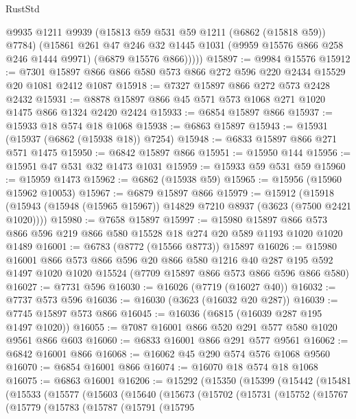 \begin{lexlean}{RustStd}
\begin{coremodule}
          @9935
          @1211
          @9939
          (@15813 @59 @531 @59 @1211 (@6862 (@15818 @59)) @7784)
          (@15861
            @261
            @47
            @246
            @32
            @1445
            @1031
            (@9959 @15576 @866 @258 @246 @1444 @9971)
            (@6879 @15576 @866)))))
@15897 := @9984 @15576
@15912 := @7301 @15897 @866 @866 @580 @573 @866 @272 @596 @220 @2434 @15529 @20 @1081 @2412 @1087
@15918 := @7327 @15897 @866 @272 @573 @2428 @2432
@15931 := @8878 @15897 @866 @45 @571 @573 @1068 @271 @1020 @1475 @866 @1324 @2420 @2424
@15933 := @6854 @15897 @866
@15937 := @15933 @18 @574 @18 @1068
@15938 := @6863 @15897
@15943 := @15931 (@15937 (@6862 (@15938 @18)) @7254)
@15948 := @6833 @15897 @866 @271 @571 @1475
@15950 := @6842 @15897 @866
@15951 := @15950 @144
@15956 := @15951 @47 @531 @32 @1473 @1031
@15959 := @15933 @59 @531 @59
@15960 := @15959 @1473
@15962 := @6862 (@15938 @59)
@15965 := @15956 (@15960 @15962 @10053)
@15967 := @6879 @15897 @866
@15979 := @15912
    (@15918 (@15943 (@15948 (@15965 @15967)) @14829 @7210 @8937 (@3623 (@7500 @2421 @1020))))
@15980 := @7658 @15897
@15997 := @15980
    @15897
    @866
    @573
    @866
    @596
    @219
    @866
    @580
    @15528
    @18
    @274
    @20
    @589
    @1193
    @1020
    @1020
    @1489
@16001 := @6783 (@8772 (@15566 @8773)) @15897
@16026 := @15980
    @16001
    @866
    @573
    @866
    @596
    @20
    @866
    @580
    @1216
    @40
    @287
    @195
    @592
    @1497
    @1020
    @1020
    @15524
    (@7709 @15897 @866 @573 @866 @596 @866 @580)
@16027 := @7731 @596
@16030 := @16026 (@7719 (@16027 @40))
@16032 := @7737 @573 @596
@16036 := @16030 (@3623 (@16032 @20 @287))
@16039 := @7745 @15897 @573 @866
@16045 := @16036 (@6815 (@16039 @287 @195 @1497 @1020))
@16055 := @7087 @16001 @866 @520 @291 @577 @580 @1020 @9561 @866 @603
@16060 := @6833 @16001 @866 @291 @577 @9561
@16062 := @6842 @16001 @866
@16068 := @16062 @45 @290 @574 @576 @1068 @9560
@16070 := @6854 @16001 @866
@16074 := @16070 @18 @574 @18 @1068
@16075 := @6863 @16001
@16206 := @15292
    (@15350
      (@15399
        (@15442
          (@15481
            (@15533
              (@15577
                (@15603
                  (@15640
                    (@15673
                      (@15702
                        (@15731
                          (@15752
                            (@15767
                              (@15779
                                (@15783
                                  (@15787
                                    (@15791
                                      (@15795

\end{coremodule}
\end{lexlean}
